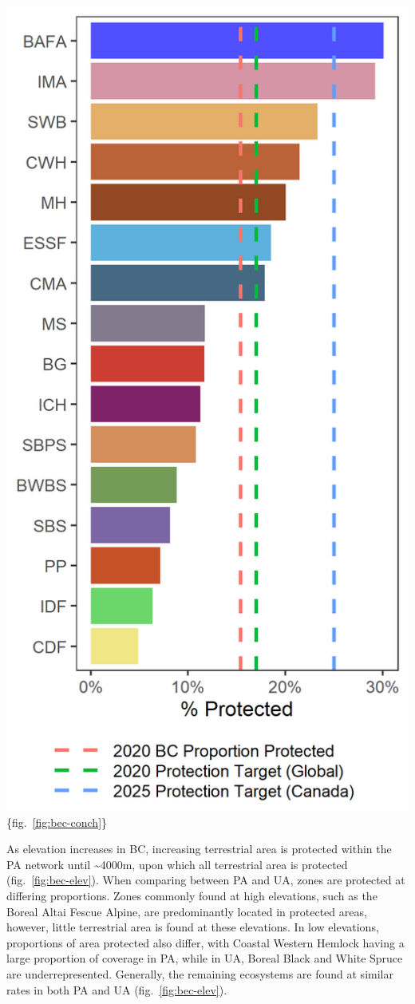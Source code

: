 \documentclass[11pt]{article}
\makeatletter
\def\maxwidth{\ifdim\Gin@nat@width>\linewidth\linewidth
\else\Gin@nat@width\fi}
\let\Oldincludegraphics\includegraphics
\renewcommand{\includegraphics}[1]{\Oldincludegraphics[width=\maxwidth]{#1}}
\makeatother
\begin{document}
\includegraphics{figures/bec_bar.png}\{fig.~\ref{fig:bec-conch}\}

As elevation increases in BC, increasing terrestrial area is protected
within the PA network until \textasciitilde4000m, upon which all
terrestrial area is protected (fig.~\ref{fig:bec-elev}). When comparing
between PA and UA, zones are protected at differing proportions. Zones
commonly found at high elevations, such as the Boreal Altai Fescue
Alpine, are predominantly located in protected areas, however, little
terrestrial area is found at these elevations. In low elevations,
proportions of area protected also differ, with Coastal Western Hemlock
having a large proportion of coverage in PA, while in UA, Boreal Black
and White Spruce are underrepresented. Generally, the remaining
ecosystems are found at similar rates in both PA and UA
(fig.~\ref{fig:bec-elev}).
\end{document}
